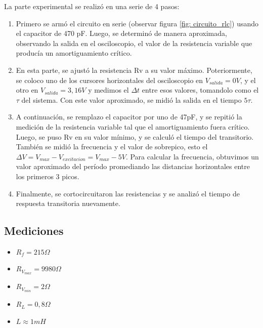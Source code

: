 \documentclass{article}
\begin{document}
    La parte experimental se realizó en una serie de 4 pasos:

    \begin{enumerate}
        \item Primero se armó el circuito en serie (observar figura \ref{fig: circuito_rlc}) usando el capacitor de 470 pF. Luego, se determinó de manera aproximada, observando la salida en el osciloscopio, el valor de la resistencia variable que producía un amortiguamiento crítico.
        \item En esta parte, se ajustó la resistencia Rv a su valor máximo. Poteriormente, se coloco uno de los cursores horizontales del osciloscopio en $ V_{salida}=0 V$, y el otro en $ V_{salida}=3,16 V$ y medimos el $ \Delta t $ entre esos valores, tomandolo como el $\tau$ del sistema. Con este valor aproximado, se midió la salida en el tiempo $ 5\tau$.
        \item A continuación, se remplazo el capacitor por uno de 47pF, y se repitió la medición de la resistencia variable tal que el amortiguamiento fuera crítico. Luego, se puso Rv en su valor mínimo, y se calculó el tiempo del transitorio. También se midió la frecuencia y el valor de sobrepico, esto el $ \Delta V = V_{max} - V_{excitacion} = V_{max} - 5 V $. Para calcular la frecuencia, obtuvimos un valor aproximado del período promediando las distancias horizontales entre los primeros 3 picos.
        \item Finalmente, se cortocircuitaron las resistencias y se analizó el tiempo de respuesta transitoria nuevamente.
        
    \end{enumerate}
    \subsection{Mediciones}
 
        \begin{itemize}
            \item $ R_f = 215 \Omega $
            \item $ R_{V_{max}} = 9980 \Omega $
            \item $ R_{V_{min}} = 2 \Omega $
            \item $ R_L = 0,8 \Omega $
            \item $ L \approx 1 mH $
        \end{itemize}
        
        \par
\end{document}
